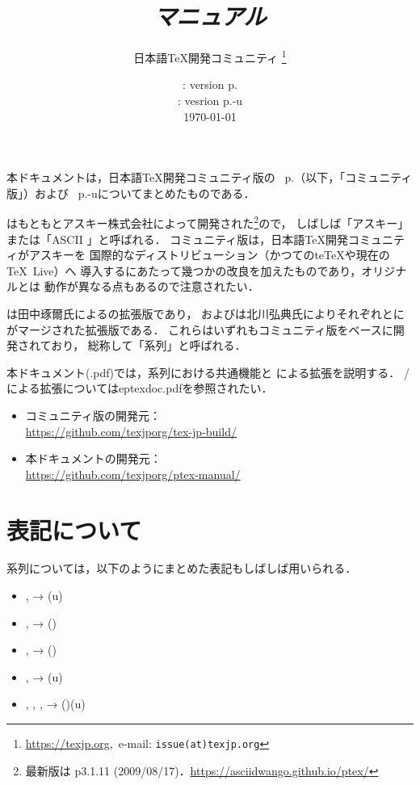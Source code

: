 \documentclass[a4paper,11pt,nomag,dvipdfmx]{jsarticle}
\def\Pver{p\the\ptexversion.\the\ptexminorversion\ptexrevision}
\def\UPver{\Pver-u\the\uptexversion\uptexrevision}
\begin{document}
\title{\emph{\pTeX マニュアル}}
\author{日本語\TeX 開発コミュニティ\null
\thanks{\url{https://texjp.org},\ e-mail: \texttt{issue(at)texjp.org}}}
\date{\pTeX: version \Pver \\ \upTeX: vesrion \UPver \\[1ex] \today}
\maketitle

本ドキュメントは，日本語\TeX 開発コミュニティ版の
\pTeX~\Pver（以下，「コミュニティ版\pTeX 」）および
\upTeX~\UPver についてまとめたものである．

\pTeX はもともとアスキー株式会社によって開発された\footnote{最新版は
p3.1.11 (2009/08/17)．\url{https://asciidwango.github.io/ptex/}}ので，
しばしば「アスキー\pTeX 」または「ASCII \pTeX 」と呼ばれる．
コミュニティ版\pTeX は，日本語\TeX 開発コミュニティがアスキー\pTeX を
国際的なディストリビューション（かつてのte\TeX や現在の\TeX~Live）へ
導入するにあたって幾つかの改良を加えたものであり，オリジナルとは
動作が異なる点もあるので注意されたい．

\upTeX は田中琢爾氏による\pTeX の拡張版であり，
\epTeX および\eupTeX は北川弘典氏によりそれぞれ\pTeX と\upTeX に
\eTeX がマージされた拡張版である．
これらはいずれもコミュニティ版\pTeX をベースに開発されており，
総称して「\pTeX 系列」と呼ばれる．

本ドキュメント(\jobname.pdf)では，\pTeX 系列における共通機能と
\upTeX による拡張を説明する．%
\epTeX/\eupTeX による拡張についてはeptexdoc.pdfを参照されたい．

\begin{itemize}
  \item コミュニティ版\pTeX の開発元：\\
    \url{https://github.com/texjporg/tex-jp-build/}
  \item 本ドキュメントの開発元：\\
    \url{https://github.com/texjporg/ptex-manual/}
\end{itemize}

\newpage
\tableofcontents

\newpage

\section*{表記について}
\pTeX 系列については，以下のようにまとめた表記もしばしば用いられる．
\begin{itemize}
  \item \pTeX, \upTeX → (u)\pTeX
  \item \pTeX, \epTeX → (\eTeXpre)\pTeX
  \item \upTeX, \eupTeX → (\eTeXpre)\upTeX
  \item \epTeX, \eupTeX → \eTeXpre(u)\pTeX
  \item \pTeX, \upTeX, \epTeX, \eupTeX → (\eTeXpre)(u)\pTeX
\end{itemize}
\end{document}
